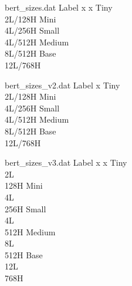 \newcommand{\addbertplot}[3]{
    \addplot+[mark=#1, mark options={#2, solid}, mark size=2.5pt, #2, #3]
        plot [error bars/.cd, y dir = both, y explicit]
        table [x=index, y=mean, col sep=comma] %
}

\begin{filecontents}{bert_sizes.dat} 
Label
x
x
{Tiny\\2L/128H} 
{Mini\\4L/256H}
{Small\\4L/512H}
{Medium\\8L/512H}
{Base\\12L/768H}
\end{filecontents}

\begin{filecontents}{bert_sizes_v2.dat} 
Label
x
{Tiny\\2L/128H} 
{Mini\\4L/256H}
{Small\\4L/512H}
{Medium\\8L/512H}
{Base\\12L/768H}
\end{filecontents}

\begin{filecontents}{bert_sizes_v3.dat} 
Label
x
x
{Tiny\\2L\\128H} 
{Mini\\4L\\256H}
{Small\\4L\\512H}
{Medium\\8L\\512H}
{Base\\12L\\768H}
\end{filecontents}

\newcommand{\fivepoints}{
    \pgfplotsset{
        every tick label/.append style={font=\scriptsize},
        enlargelimits=true,
        grid=minor,
        legend pos=north west,
        legend cell align={left},
        legend columns=4,
        legend style={font=\tiny},
        xlabel style={font=\scriptsize},
        ylabel style={font=\scriptsize},
        title style={font=\small},
    }
}

